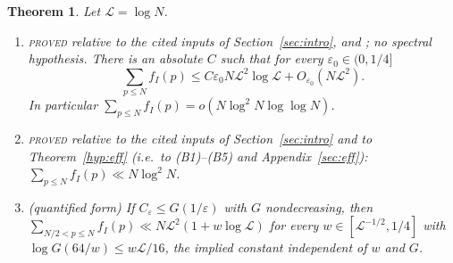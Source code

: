 \documentclass[10pt,reqno]{amsart}
\newtheorem{theorem}{Theorem}[section]
\theoremstyle{definition}
\numberwithin{equation}{section}
\newcommand{\cL}{\mathcal L}
\newcommand{\status}[1]{\textup{\textsc{#1}}}
\begin{document}
\begin{theorem}\label{E:main}
Let $\cL=\log N$.
\begin{enumerate}
\item[(i)] \status{proved} relative to the cited inputs of
Section~\ref{sec:intro}, \cite[Theorem~7]{DI} and \cite[Lemma~4.10]{Dr};
no spectral hypothesis. There is an absolute $C$ such that for every
$\varepsilon_0\in(0,1/4]$
\[
 \sum_{p\le N}f_I(p)\le C\varepsilon_0N\cL^2\log\cL+O_{\varepsilon_0}(N\cL^2).
\]
In particular $\sum_{p\le N}f_I(p)=o(N\log^2N\log\log N)$.
\item[(ii)] \status{proved} relative to the cited inputs of
Section~\ref{sec:intro} and to Theorem~\ref{hyp:eff} \textup(i.e.\ to
(B1)--(B5) and Appendix~\ref{sec:eff}\textup): $\sum_{p\le N}f_I(p)\ll N\log^2N$.
\item[(iii)] (quantified form) If $C_\varepsilon\le G(1/\varepsilon)$ with $G$
nondecreasing, then $\sum_{N/2<p\le N}f_I(p)\ll N\cL^2(1+w\log\cL)$ for every
$w\in[\cL^{-1/2},1/4]$ with $\log G(64/w)\le w\cL/16$, the implied constant
independent of $w$ and $G$.
\end{enumerate}
\end{theorem}
\end{document}
